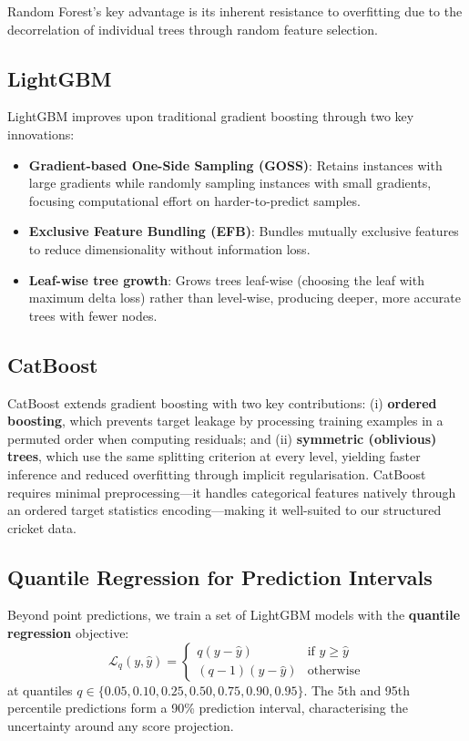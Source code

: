 \documentclass[12pt,a4paper,oneside]{report}
\begin{document}
Random Forest's key advantage is its inherent resistance to overfitting due to the decorrelation of individual trees through random feature selection.

\subsection{LightGBM}

LightGBM \citep{ke2017lightgbm} improves upon traditional gradient boosting through two key innovations:

\begin{itemize}[nosep]
    \item \textbf{Gradient-based One-Side Sampling (GOSS)}: Retains instances with large gradients while randomly sampling instances with small gradients, focusing computational effort on harder-to-predict samples.
    \item \textbf{Exclusive Feature Bundling (EFB)}: Bundles mutually exclusive features to reduce dimensionality without information loss.
    \item \textbf{Leaf-wise tree growth}: Grows trees leaf-wise (choosing the leaf with maximum delta loss) rather than level-wise, producing deeper, more accurate trees with fewer nodes.
\end{itemize}

\subsection{CatBoost}

CatBoost \citep{prokhorenkova2018catboost} extends gradient boosting with two key contributions: (i) \textbf{ordered boosting}, which prevents target leakage by processing training examples in a permuted order when computing residuals; and (ii) \textbf{symmetric (oblivious) trees}, which use the same splitting criterion at every level, yielding faster inference and reduced overfitting through implicit regularisation.  CatBoost requires minimal preprocessing---it handles categorical features natively through an ordered target statistics encoding---making it well-suited to our structured cricket data.

\subsection{Quantile Regression for Prediction Intervals}

Beyond point predictions, we train a set of LightGBM models with the \textbf{quantile regression} objective:
\begin{equation}
\mathcal{L}_q(y, \hat{y}) = \begin{cases} q(y - \hat{y}) & \text{if } y \geq \hat{y} \\ (q-1)(y - \hat{y}) & \text{otherwise} \end{cases}
\end{equation}
at quantiles $q \in \{0.05, 0.10, 0.25, 0.50, 0.75, 0.90, 0.95\}$.  The 5th and 95th percentile predictions form a 90\% prediction interval, characterising the uncertainty around any score projection.
\end{document}
